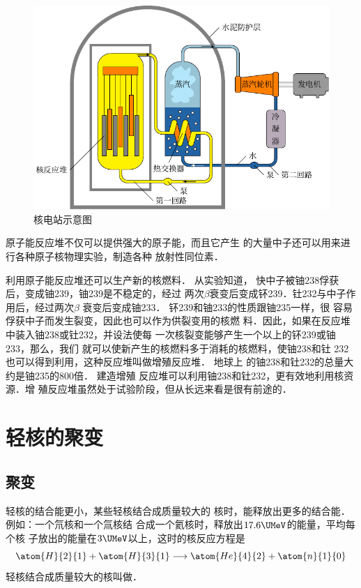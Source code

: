 \begin{figure}[htbp]
    \centering
    \includegraphics{fig/C/9-15.pdf}
    \caption{核电站示意图}\label{fig_C_9-15}
\end{figure}

原子能反应堆不仅可以提供强大的原子能，而且它产生
的大量中子还可以用来进行各种原子核物理实验，制造各种
放射性同位素．

利用原子能反应堆还可以生产新的核燃料．
从实验知道，
快中子被铀238俘获后，变成铀239，铀239是不稳定的，经过
两次$\beta$衰变后变成钚239．钍232与中子作用后，经过两次$\beta$
衰变后变成铀233．
钚239和铀233的性质跟铀235一样，很
容易俘获中子而发生裂变，因此也可以作为供裂变用的核燃
料．因此，如果在反应堆中装入铀238或钍232，并设法使每
一次核裂变能够产生一个以上的钚239或铀233，那么，我们
就可以使新产生的核燃料多于消耗的核燃料，使铀238和钍
232也可以得到利用，这种反应堆叫做增殖反应堆．
地球上
的铀238和钍232的总量大约是铀235的800倍．
建造增殖
反应堆可以利用铀238和钍232，更有效地利用核资源．增
殖反应堆虽然处于试验阶段，但从长远来看是很有前途的．

\section{轻核的聚变}
\subsection{聚变}
轻核的结合能更小，某些轻核结合成质量较大的
核时，能释放出更多的结合能．例如：一个氘核和一个氚核结
合成一个氦核时，释放出$17.6 \UMeV$的能量，平均每个核
子放出的能量在$3 \UMeV$以上，这时的核反应方程是
\[\atom{H}{2}{1}+\atom{H}{3}{1}\longrightarrow \atom{He}{4}{2}+\atom{n}{1}{0} 
    \]
轻核结合成质量较大的核叫做．

